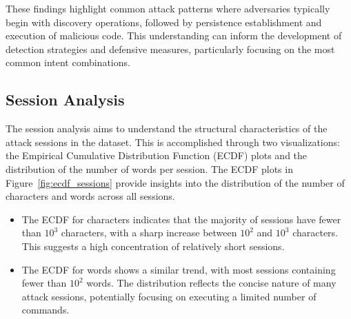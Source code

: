         These findings highlight common attack patterns where adversaries typically begin with discovery operations, followed by persistence establishment and execution of malicious code. This understanding can inform the development of detection strategies and defensive measures, particularly focusing on the most common intent combinations.
        
    \subsection{Session Analysis}

        The session analysis aims to understand the structural characteristics of the attack sessions in the dataset. This is accomplished through two visualizations: the Empirical Cumulative Distribution Function (ECDF) plots and the distribution of the number of words per session. The ECDF plots in Figure~\ref{fig:ecdf_sessions} provide insights into the distribution of the number of characters and words across all sessions. 
        
        \vspace{0.2em}
        
        \begin{itemize}
        
            \item The ECDF for characters indicates that the majority of sessions have fewer than $10^3$ characters, with a sharp increase between $10^2$ and $10^3$ characters. This suggests a high concentration of relatively short sessions.
            
            \vspace{0.2em}
            
            \item The ECDF for words shows a similar trend, with most sessions containing fewer than $10^2$ words. The distribution reflects the concise nature of many attack sessions, potentially focusing on executing a limited number of commands.
            
        \end{itemize}
        
        \vspace{0.2em}

        \clearpage
        

